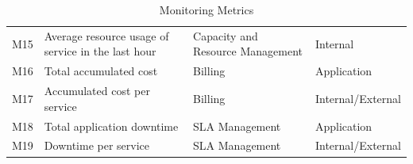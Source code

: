 \begin{table}[]
\begin{tabular}{llll}
M15 & Average resource usage of service in the last hour & Capacity and Resource Management & Internal                                \\
M16 & Total accumulated cost                             & Billing                          & Application                             \\
M17 & Accumulated cost per service                       & Billing                          & Internal/External                       \\
M18 & Total application downtime                         & SLA Management                   & Application                             \\
M19 & Downtime per service                               & SLA Management                   & Internal/External                      
\end{tabular}
\caption{Monitoring Metrics}
\label{tab:monitoring_metrics}
\end{table}